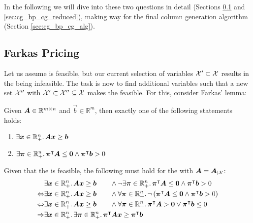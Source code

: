 In the following we will dive into these two questions in detail (Sections \ref{sec:cg_bp_cg_farkas} and \ref{sec:cg_bp_cg_reduced}), making way for the final column generation algorithm (Section \ref{sec:cg_bp_cg_alg}).

\subsection{Farkas Pricing}\label{sec:cg_bp_cg_farkas}
Let us assume \MP{} is feasible, but our current selection of variables $\mathcal{X}' \subset \mathcal{X}$ results in the \RMP{} being infeasible. The task is now to find additional variables such that a new set $\mathcal{X}''$ with $\mathcal{X}' \subset \mathcal{X}'' \subseteq \mathcal{X}$ makes the \RMP{} feasible. For this, consider Farkas' lemma:

\begin{theorem}\label{th:farkas_lemma}
Given ${\bm{A}} \in \mathbb{R}^{m \times n}$ and $\vec{b} \in \mathbb{R}^m$, then exactly one of the following statements holds:
\begin{enumerate}
	\item $\exists {\bm{x}} \in \mathbb{R}_+^n. \, {\bm{A}} {\bm{x}} \geq {\bm{b}}$
	\item $\exists {\bm{\pi}} \in \mathbb{R}_+^n. \, {\bm{\pi}}^\intercal {\bm{A}} \leq {\bm{0}} \land {\bm{\pi}}^\intercal {\bm{b}} > 0$
\end{enumerate}
\end{theorem}

Given that the \MP{} is feasible, the following must hold for the \MP{} with ${\bm{A}} = {\bm{A}}_{\vert \mathcal{X}}$:
\begin{equation}
\begin{aligned}
& \exists {\bm{x}} \in \mathbb{R}_+^n. \, {\bm{A}} {\bm{x}} \geq {\bm{b}} \qquad \land \neg \exists {\bm{\pi}} \in \mathbb{R}_+^n. \, {\bm{\pi}}^\intercal {\bm{A}} \leq {\bm{0}} \land {\bm{\pi}}^\intercal {\bm{b}} > 0 \\
\Leftrightarrow & \exists {\bm{x}} \in \mathbb{R}_+^n. \, {\bm{A}} {\bm{x}} \geq {\bm{b}} \qquad \land \forall {\bm{\pi}} \in \mathbb{R}_+^n. \, \neg \left( {\bm{\pi}}^\intercal {\bm{A}} \leq {\bm{0}} \land {\bm{\pi}}^\intercal {\bm{b}} > 0 \right)\\
\Leftrightarrow & \exists {\bm{x}} \in \mathbb{R}_+^n. \, {\bm{A}} {\bm{x}} \geq {\bm{b}} \qquad \land \forall {\bm{\pi}} \in \mathbb{R}_+^n. \, {\bm{\pi}}^\intercal {\bm{A}} > {\bm{0}} \lor {\bm{\pi}}^\intercal {\bm{b}} \leq 0 \\
\Rightarrow & \exists {\bm{x}} \in \mathbb{R}_+^n. \, \exists {\bm{\pi}} \in \mathbb{R}_+^n. \, {\bm{\pi}}^\intercal {\bm{A}} {\bm{x}} \geq {\bm{\pi}}^\intercal {\bm{b}}
\end{aligned}
\end{equation}

